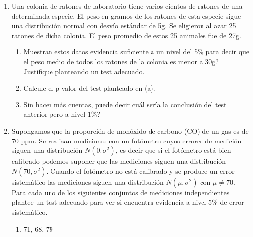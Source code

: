 \documentclass[11pt,a4paper,twoside]{article}%
\begin{document}
\begin{enumerate}

\item Una colonia de ratones de laboratorio tiene varios cientos de ratones de una determinada especie. El peso en gramos de los ratones de esta especie sigue una distribuci\'on normal con desv\'io est\'andar de 5g. Se eligieron al azar 25 ratones de dicha colonia. El peso promedio de estos 25 animales fue de 27g.
\begin{enumerate}
\item \textquestiondown Muestran estos datos evidencia suficiente a un nivel del 5\% para decir que el peso medio de todos los ratones de la colonia es menor a 30g? Justifique planteando un test adecuado.
\item Calcule el p-valor del test planteado en (a).
\item Sin hacer m\'as cuentas, \textquestiondown puede decir cu\'al ser\'ia la conclusi\'on del test anterior pero a nivel 1\%?
\end{enumerate}

\item Supongamos que la proporci\'{o}n de mon\'{o}xido de carbono (CO) de un
gas es de 70 ppm. Se realizan mediciones con un fot\'{o}metro cuyos errores de
medici\'{o}n siguen una distribuci\'{o}n $N(0,\sigma^{2})$, es decir que si el
fot\'{o}metro est\'{a} bien calibrado podemos suponer que las mediciones
siguen una distribuci\'{o}n $N(70,\sigma^{2})$. Cuando el fot\'{o}metro no
est\'{a} calibrado y se produce un error sistem\'{a}tico las mediciones siguen
una distribuci\'{o}n $N(\mu,\sigma^{2})$ con $\mu\neq70$. Para cada uno de los
siguientes conjuntos de mediciones independientes plantee un test adecuado
para ver si encuentra evidencia a nivel 5\% de error sistem\'{a}tico.

\begin{enumerate}
\item 71, 68, 79


\end{enumerate}
\end{enumerate}
\end{document}
